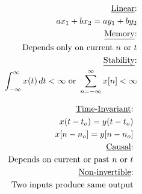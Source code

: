 \begin{multicols}{2}

  \begin{equation*}
    \begin{split}
      \text{\underline{Linear}:}\\
      ax_1+bx_2=ay_1+by_2\\
      \text{\underline{Memory}:}\\
      \text{Depends only on current $n$ or $t$}\\
      \text{\underline{Stability}:}\\
      \int_{-\infty}^{\infty} x(t)\,dt<\infty\text{ or }\sum_{n=-\infty}^{\infty} x[n]<\infty
    \end{split}
    \label{9}
  \end{equation*}

  \begin{equation*}
    \begin{split}
      \text{\underline{Time-Invariant}:}\\
      x(t-t_o)=y(t-t_o)\\x[n-n_o]=y[n-n_o]\\
      \text{\underline{Causal}:}\\
      \text{Depends on current or past $n$ or $t$}\\
      \text{\underline{Non-invertible}:}\\
      \text{Two inputs produce same output}\\
    \end{split}
    \label{10}
  \end{equation*}

\end{multicols}



